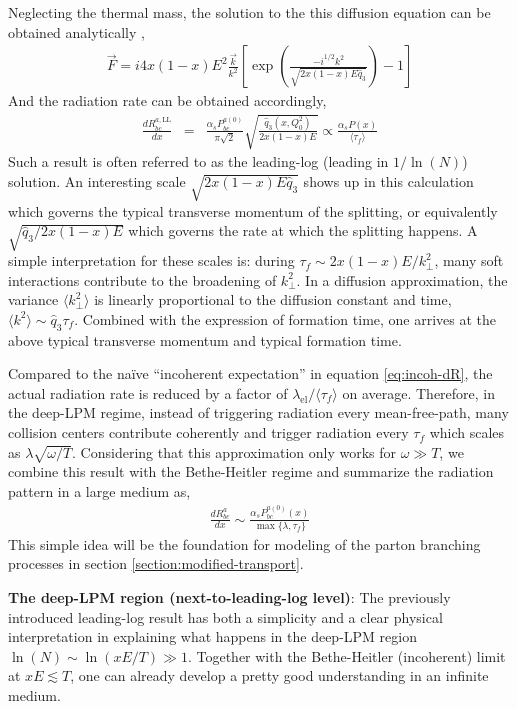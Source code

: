 Neglecting the thermal mass, the solution to the this diffusion equation can be obtained analytically \cite{Arnold:2008zu},
\begin{eqnarray}
\vec{F} = i 4x(1-x)E^2 \frac{\vec{k}}{k^2} \left[\exp\left(\frac{-i^{1/2}k^2}{\sqrt{2x(1-x)E\hat{q}_3}}\right)-1\right]
\end{eqnarray}
And the radiation rate can be obtained accordingly,
\begin{eqnarray}\label{eq:AMY-LL}
\frac{dR_{bc}^{a,\textrm{LL}}}{dx} &=& \frac{\alpha_s P_{bc}^{a(0)}}{\pi\sqrt{2}}
\sqrt{\frac{\hat{q}_3(x, Q_0^2)}{2x(1-x)E}} \propto \frac{\alpha_s P(x)}{\langle \tau_f \rangle}
\end{eqnarray}
Such a result is often referred to as the leading-log (leading in $1/\ln(N)$) solution.
An interesting scale $\sqrt{2x(1-x)E\hat{q}_3}$ shows up in this calculation which governs the typical transverse momentum of the splitting, or equivalently $\sqrt{\hat{q}_3/2x(1-x)E}$ which governs the rate at which the splitting happens.
A simple interpretation for these scales is:
during $\tau_f \sim 2x(1-x)E/k_\perp^2$, many soft interactions contribute to the broadening of $k_\perp^2$.
In a diffusion approximation, the variance $\langle k_\perp^2 \rangle$ is linearly proportional to the diffusion constant and time, $\langle k^2\rangle \sim \hat{q}_3\tau_f$.
Combined with the expression of formation time, one arrives at the above typical transverse momentum and typical formation time.

Compared to the na\"ive ``incoherent expectation'' in equation \ref{eq:incoh-dR}, the actual radiation rate is reduced by a factor of $\lambda_{\textrm{el}}/\langle \tau_f \rangle$ on average. 
Therefore, in the deep-LPM regime, instead of triggering radiation every mean-free-path, many collision centers contribute coherently and trigger radiation every $\tau_f$ which scales as $\lambda \sqrt{\omega/T}$.
Considering that this approximation only works for $\omega \gg T$, we combine this result with the Bethe-Heitler regime and summarize the radiation pattern in a large medium as,
\begin{eqnarray}
\frac{dR^a_{bc}}{dx} \sim \frac{\alpha_s P^{a(0)}_{bc}(x)}{\max\{\lambda, \tau_f\}}
\end{eqnarray}
This simple idea will be the foundation for modeling of the parton branching processes in section \ref{section:modified-transport}.

{\bf The deep-LPM region (next-to-leading-log level)}:
The previously introduced leading-log result has both a simplicity and a clear physical interpretation in explaining what happens in the deep-LPM region $\ln(N) \sim \ln(xE/T) \gg 1$.
Together with the Bethe-Heitler (incoherent) limit at $xE \lesssim T$, one can already develop a pretty good understanding in an infinite medium.

